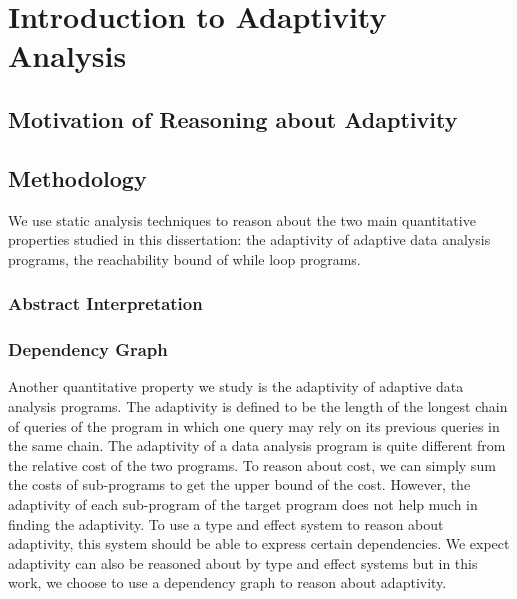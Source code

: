 \chapter{Introduction to Adaptivity Analysis}
\label{introduction}



\section{Motivation of Reasoning about Adaptivity}
\section{Methodology}
We use static analysis techniques to reason about the two main quantitative properties studied in this dissertation: 
the adaptivity of adaptive data analysis programs,
the reachability bound of while loop programs. 

\subsection{Abstract Interpretation}

\subsection{Dependency Graph}
Another quantitative property we study is the adaptivity of adaptive data analysis programs. 
{The adaptivity is defined to be the length of the longest chain of queries of the program in which one query may rely 
on its previous queries in the same chain. 
The adaptivity of a data analysis program is quite different from the relative cost of the two programs. To reason about cost, we can simply sum the costs of sub-programs to get the upper bound of the cost. However, the adaptivity of each sub-program of the target program does not help much in finding the adaptivity. To use a type and effect system to reason about adaptivity, this system should be able to express certain dependencies.
We expect adaptivity can also be reasoned about by type and effect systems but in this work, we choose to use a dependency graph to reason about adaptivity.}

